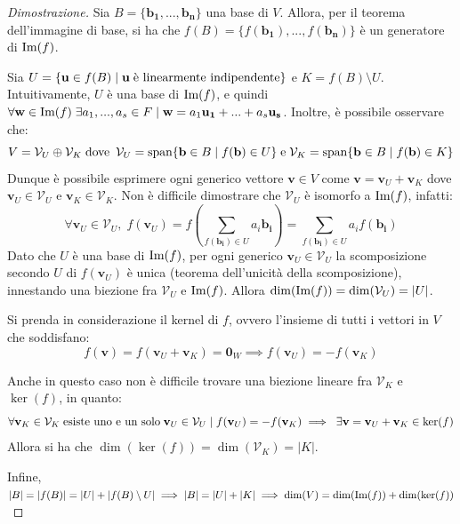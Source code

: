 \documentclass{article}
\begin{document}
    \begin{proof}[Dimostrazione] 
        Sia $B = \{ \mathbf{b_1}, ..., \mathbf{b_n} \}$ una base di $V$. Allora, per il teorema dell'immagine di base, si ha che $f(B) = \{f(\mathbf{b_1}), ..., f(\mathbf{b_n})\}$ è un generatore di $\textnormal{Im}(f)$. 
        
        \vspace{10pt}
        Sia $U = \{ \mathbf{u} \in f(B) \; | \; \mathbf{u} \; \textnormal{è linearmente indipendente} \}$ e $K = f(B) \setminus U$. Intuitivamente, $U$ è una base di $\textnormal{Im}(f)$, e quindi
        $\forall \mathbf{w} \in \textnormal{Im}(f) \; \exists a_1, ..., a_s \in F \; | \; \mathbf{w} = a_1 \mathbf{u_1} + ... + a_s \mathbf{u_s}$. Inoltre, è possibile osservare che:
        \[
            V = \mathcal{V}_U \oplus \mathcal{V}_K \; \textnormal{dove} \;\: \mathcal{V}_U = \textnormal{span}\{\mathbf{b} \in B \; | \; f(\mathbf{b}) \in U\} \; \textnormal{e} \; \mathcal{V}_K = \textnormal{span}\{\mathbf{b} \in B \; | \; f(\mathbf{b}) \in K\} 
        \]
        Dunque è possibile esprimere ogni generico vettore $\mathbf{v} \in V$ come $\mathbf{v} = \mathbf{v}_U + \mathbf{v}_K$ dove $\mathbf{v}_U \in \mathcal{V}_U$ e $\mathbf{v}_K \in \mathcal{V}_K$.
        Non è difficile dimostrare che $\mathcal{V}_U$ è isomorfo a $\textnormal{Im}(f)$, infatti:
        \[
            \forall \mathbf{v}_U \in \mathcal{V}_U, \; f(\mathbf{v}_U) = f(\sum_{f(\mathbf{b_i}) \in U} a_i \mathbf{b_i}) = \sum_{f(\mathbf{b_i}) \in U} a_i f(\mathbf{b_i})
        \]
        Dato che $U$ è una base di $\textnormal{Im}(f)$, per ogni generico $\mathbf{v}_U \in \mathcal{V}_U$ la scomposizione secondo $U$ di $f(\mathbf{v}_U)$ è unica (teorema dell'unicità della scomposizione), innestando una biezione fra $\mathcal{V}_U$ e $\textnormal{Im}(f)$. Allora $\dim(\textnormal{Im}(f)) = \dim(\mathcal{V}_U) = |U|$.

        \vspace{10pt}
        Si prenda in considerazione il kernel di $f$, ovvero l'insieme di tutti i vettori in $V$ che soddisfano:
        \[
            f(\mathbf{v}) = f(\mathbf{v}_U + \mathbf{v}_K) = \mathbf{0}_W \implies f(\mathbf{v}_U) = -f(\mathbf{v}_K) 
        \]

        Anche in questo caso non è difficile trovare una biezione lineare fra $\mathcal{V}_K$ e $\ker(f)$, in quanto:
        \[
            \forall \mathbf{v}_K \in \mathcal{V}_K \; \textnormal{esiste uno e un solo} \; \mathbf{v}_U \in \mathcal{V}_U \; | \; f(\mathbf{v}_U) = -f(\mathbf{v}_K) \implies \; \exists \mathbf{v} = \mathbf{v}_U + \mathbf{v}_K \in \ker(f)
        \]
        Allora si ha che $\dim(\ker(f)) = \dim(\mathcal{V}_K) = |K|$.

        \vspace{10pt}
        Infine, $|B| = |f(B)| = |U| + |f(B) \setminus U| \implies |B| = |U| + |K| \implies \dim(V) = \dim(\textnormal{Im}(f)) + \dim(\ker(f))$
    \end{proof}
\end{document}
